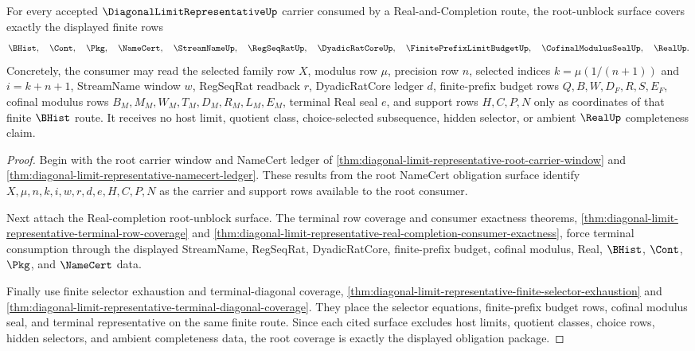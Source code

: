 \begin{theorem}\label{thm:diagonal-limit-representative-root-coverage}
For every accepted $\DiagonalLimitRepresentativeUp$ carrier consumed by a Real-and-Completion route, the root-unblock surface covers exactly the displayed finite rows
$$
\BHist,\quad \Cont,\quad \Pkg,\quad \NameCert,\quad
\StreamNameUp,\quad \RegSeqRatUp,\quad \DyadicRatCoreUp,\quad
\FinitePrefixLimitBudgetUp,\quad \CofinalModulusSealUp,\quad \RealUp.
$$
Concretely, the consumer may read the selected family row $X$, modulus row $\mu$, precision row $n$, selected indices $k=\mu(1/(n+1))$ and $i=k+n+1$, StreamName window $w$, RegSeqRat readback $r$, DyadicRatCore ledger $d$, finite-prefix budget rows $Q,B,W,D_F,R,S,E_F$, cofinal modulus rows $B_M,M_M,W_M,T_M,D_M,R_M,L_M,E_M$, terminal Real seal $e$, and support rows $H,C,P,N$ only as coordinates of that finite $\BHist$ route. It receives no host limit, quotient class, choice-selected subsequence, hidden selector, or ambient $\RealUp$ completeness claim.
\end{theorem}
\begin{proof}
Begin with the root carrier window and NameCert ledger of \autoref{thm:diagonal-limit-representative-root-carrier-window} and \autoref{thm:diagonal-limit-representative-namecert-ledger}. These results from the root NameCert obligation surface identify $X,\mu,n,k,i,w,r,d,e,H,C,P,N$ as the carrier and support rows available to the root consumer.

Next attach the Real-completion root-unblock surface. The terminal row coverage and consumer exactness theorems, \autoref{thm:diagonal-limit-representative-terminal-row-coverage} and \autoref{thm:diagonal-limit-representative-real-completion-consumer-exactness}, force terminal consumption through the displayed StreamName, RegSeqRat, DyadicRatCore, finite-prefix budget, cofinal modulus, Real, $\BHist$, $\Cont$, $\Pkg$, and $\NameCert$ data.

Finally use finite selector exhaustion and terminal-diagonal coverage, \autoref{thm:diagonal-limit-representative-finite-selector-exhaustion} and \autoref{thm:diagonal-limit-representative-terminal-diagonal-coverage}. They place the selector equations, finite-prefix budget rows, cofinal modulus seal, and terminal representative on the same finite route. Since each cited surface excludes host limits, quotient classes, choice rows, hidden selectors, and ambient completeness data, the root coverage is exactly the displayed obligation package.
\end{proof}

